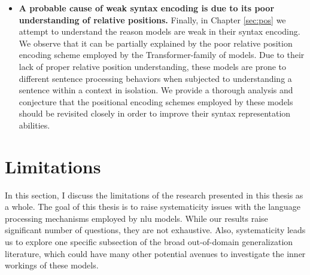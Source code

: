 \documentclass[letterpaper, 12pt]{report}
\begin{document}
\begin{itemize}
  \item \textbf{A probable cause of weak syntax encoding is due to its poor understanding of relative positions.} Finally, in Chapter \autoref{sec:pos} we attempt to understand the reason models are weak in their syntax encoding. We observe that it can be partially explained by the poor relative position encoding scheme employed by the Transformer-family of models. Due to their lack of proper relative position understanding, these models are prone to different sentence processing behaviors when subjected to understanding a sentence within a context in isolation. We provide a thorough analysis and conjecture that the positional encoding schemes employed by these models should be revisited closely in order to improve their syntax representation abilities.

\end{itemize}

\section{Limitations}
\label{sec:conc_limits}

In this section, I discuss the limitations of the research presented in this thesis as a whole. The goal of this thesis is to raise systematicity issues with the language processing mechanisms employed by \acrshort{nlu} models. While our results raise significant number of questions, they are not exhaustive. Also, systematicity leads us to explore one specific subsection of the broad out-of-domain generalization literature, which could have many other potential avenues to investigate the inner workings of these models.
\end{document}
